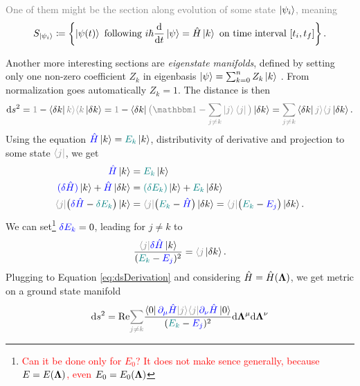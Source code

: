 \textcolor{gray}{
One of them might be the section along \Schrodinger evolution of some state $\ket{\psi_i}$, meaning
$$
    S_{\ket{\psi_i}}\coloneqq \left\{ \ket{\psi(t)} \text{ following } i\hbar \frac{\mathrm{d}}{\mathrm{d} t}\ket{\psi}=\hat{H}\ket{k}  \text{ on time interval }[t_i, t_f]\right\}.
$$
}

Another more interesting sections are \emph{eigenstate manifolds}, defined by setting only one non-zero coefficient $Z_k$ in eigenbasis $\ket{\psi}=\sum_{k=0}^n Z_k \ket{k}$
. From normalization goes automatically $Z_k=1$. 
The distance is then
\begin{equation}
    \d s^2 = \textcolor{gray}{1}-\bra{\delta k}\textcolor{gray}{k\rangle \langle k}\ket{\delta k}=\textcolor{gray}{1}-\bra{\delta k}\textcolor{gray}{\big(\Id-\sum_{j\neq k} \ket{j}\bra{j}\big)}\ket{\delta k} = \textcolor{gray}{\sum_{j\neq k}}\bra{\delta k}\textcolor{gray}{j\rangle \langle j}\ket{\delta k}.
    \label{eq:dsDerivation}
\end{equation}
Using the \Schrodinger equation $\textcolor{blue}{\hat{H}}\ket{k}=\textcolor{teal}{E_k} \ket{k}$, distributivity of derivative and projection to some state $\textcolor{gray}{\bra{j}}$, we get
\begin{equation}
    \begin{split}
        \textcolor{blue}{\HH}\ket{k} &= \textcolor{teal}{E_k}\ket{k}\\
        \textcolor{blue}{(\delta \HH)}\ket{k} +\textcolor{blue}{\HH}\ket{\delta k} &=\textcolor{teal}{(\delta E_k)}\ket{k} +\textcolor{teal}{E_k}\ket{\delta k}\\
         \textcolor{gray}{\bra{j}}\big(\textcolor{blue}{\delta \HH}-\textcolor{teal}{\delta E_k}\big)\ket{k}&=\textcolor{gray}{\bra{j}}\big(\textcolor{teal}{E_k}-\textcolor{blue}{\HH}\big)\ket{\delta k}=\textcolor{gray}{\bra{j}}\big(\textcolor{teal}{E_k}-\textcolor{blue}{E_j}\big)\ket{\delta k}.
    \end{split}
\end{equation}
We can set\footnote{\textcolor{red}{Can it be done only for $E_0$? It does not make sence generally, because $E=E({\bm\Lambda})$, even $E_0=E_0({\bm\Lambda})$}} $\textcolor{blue}{\delta E_k}=0$, leading for $j\neq k$ to
\begin{equation}
    \frac{\textcolor{gray}{\bra{j}}\textcolor{blue}{\delta \HH}\ket{k}}{(\textcolor{teal}{E_k}-\textcolor{blue}{E_j})^2}=\textcolor{gray}{\langle j}\ket{\delta k}.
    \label{eq:braket_k,deltaj}
\end{equation}
Plugging to Equation \ref{eq:dsDerivation} and considering $\hat{H}=\hat{H}({\bm\Lambda})$, we get metric on a ground state manifold
\begin{equation}
    \d s^2 = \Re\textcolor{gray}{\sum_{j\neq k}} \frac{\bra{0}\textcolor{blue}{\partial_\mu \HH \textcolor{gray}{\ket{j}}}\textcolor{gray}{\bra{j}}\textcolor{blue}{\partial_\nu \HH}\ket{0}}{(\textcolor{teal}{E_k}-\textcolor{blue}{E_j})^2}  \d \llambda^\mu\d \llambda^\nu
    \label{eq:distanceonM}
\end{equation}


